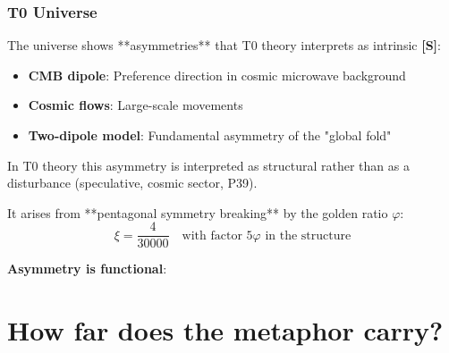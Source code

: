 	\subsubsection{T0 Universe}

	The universe shows **asymmetries** that T0 theory interprets as intrinsic \textbf{[S]}:

	\begin{itemize}
		\item \textbf{CMB dipole}: Preference direction in cosmic microwave background
		\item \textbf{Cosmic flows}: Large-scale movements
		\item \textbf{Two-dipole model}: Fundamental asymmetry of the "global fold"
	\end{itemize}

	In T0 theory this asymmetry is interpreted as structural rather than as a disturbance (speculative, cosmic sector, P39).

	It arises from **pentagonal symmetry breaking** by the golden ratio $\varphi$:
	\begin{equation}
		\xi = \frac{4}{30000} \quad \text{with factor } 5\varphi \text{ in the structure}
	\end{equation}

	\begin{keyresult}
		\textbf{Asymmetry is functional}:

		\vspace{0.3cm}

		\begin{center}
		\end{center}
	\end{keyresult}

	\section{How far does the metaphor carry?}

